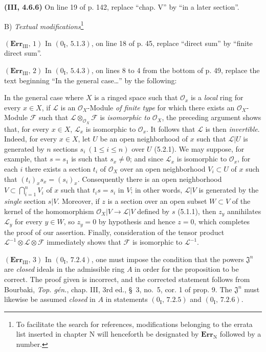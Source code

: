 \documentclass[10pt,oneside]{book}
\newcommand{\sh}[1]{\mathscr{#1}}
\newcommand{\oldpage}[2][]{\setcounter{footnote}{0}\marginpar{\scriptsize\textbf{#1}~|~#2}\ignorespaces}
\begin{document}
\noindent\textbf{(III, 4.6.6)} On line 19 of p. 142, replace ``chap. V'' by
``in a later section''.

\begin{center}
B) \emph{Textual modifications}\footnote{To facilitate the search for
references, modifications belonging to the errata list inserted in chapter N
will henceforth be designated by $\mathbf{Err}_{\mathrm N}$ followed by a
number.}
\end{center}

\noindent\textbf{$(\mathbf{Err}_{\mathrm{III}},\,1)$} In
$(0_{\mathrm I},\,5.1.3)$, on line 18 of p. 45, replace ``direct sum'' by
``finite direct sum''.

\noindent\textbf{$(\mathbf{Err}_{\mathrm{III}},\,2)$} In
$(0_{\mathrm I},\,5.4.3)$, on lines 8 to 4 from the bottom of p. 49, replace
the text beginning ``In the general case\ldots{}'' by the following:

In the general case where $X$ is a ringed space such that $\sh{O}_x$ is a
\emph{local} ring for
\oldpage[III]{219}
every $x\in X$, if $\sh{L}$ is an $\sh{O}_X$-Module \emph{of finite type} for
which there exists an $\sh{O}_X$-Module $\sh{F}$ such that
$\sh{L}\otimes_{\sh{O}_X}\sh{F}$ is \emph{isomorphic to} $\sh{O}_X$, the
preceding argument shows that, for every $x\in X$, $\sh{L}_x$ is isomorphic to
$\sh{O}_x$. It follows that $\sh{L}$ is then \emph{invertible}. Indeed, for
every $x\in X$, let $U$ be an open neighborhood of $x$ such that $\sh{L}|U$ is
generated by $n$ sections $s_i\ (1\leq i\leq n)$ over $U$ (5.2.1). We may
suppose, for example, that $s=s_1$ is such that $s_x\ne0$; and since
$\sh{L}_x$ is isomorphic to $\sh{O}_x$, for each $i$ there exists a section
$t_i$ of $\sh{O}_X$ over an open neighborhood $V_i\subset U$ of $x$ such that
$(t_i)_x s_x=(s_i)_x$. Consequently there is an open neighborhood
$V\subset\bigcap_{i=1}^nV_i$ of $x$ such that $t_i s=s_i$ in $V$; in other
words, $\sh{L}|V$ is generated by the \emph{single} section $s|V$. Moreover,
if $z$ is a section over an open subset $W\subset V$ of the kernel of the
homomorphism $\sh{O}_X|V\to\sh{L}|V$ defined by $s$ (5.1.1), then $z_y$
annihilates $\sh{L}_y$ for every $y\in W$, so $z_y=0$ by hypothesis and hence
$z=0$, which completes the proof of our assertion. Finally, consideration of
the tensor product $\sh{L}^{-1}\otimes\sh{L}\otimes\sh{F}$ immediately shows
that $\sh{F}$ is isomorphic to $\sh{L}^{-1}$.

\noindent\textbf{$(\mathbf{Err}_{\mathrm{III}},\,3)$} In
$(0_{\mathrm I},\,7.2.4)$, one must impose the condition that the powers
$\mathfrak J^n$ are \emph{closed} ideals in the admissible ring $A$ in order
for the proposition to be correct. The proof given is incorrect, and the
corrected statement follows from Bourbaki, \emph{Top. gén.}, chap. III, 3rd
ed., \S~3, no.~5, cor. 1 of prop. 9. The $\mathfrak J^n$ must likewise be
assumed \emph{closed} in $A$ in statements $(0_{\mathrm I},\,7.2.5)$ and
$(0_{\mathrm I},\,7.2.6)$.
\end{document}
